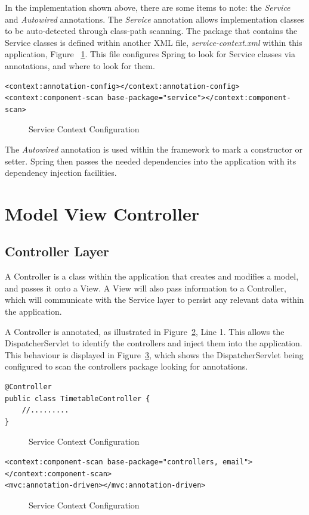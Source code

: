 In the implementation shown above, there are some items to note: the \textit{Service} and \textit{Autowired} annotations. The \textit{Service} annotation allows implementation classes to be auto-detected through class-path scanning. The package that contains the Service classes is defined within another XML file, \textit{service-context.xml} within this application, Figure ~\ref{fig:serviceContext}. This file configures Spring to look for Service classes via annotations, and where to look for them.

\begin{lstlisting}
<context:annotation-config></context:annotation-config>
<context:component-scan base-package="service"></context:component-scan>
\end{lstlisting}
\begin{figure}[H]
\caption{Service Context Configuration}
\label{fig:serviceContext}
\end{figure}

The \textit{Autowired} annotation is used within the framework to mark a constructor or setter. Spring then passes the needed dependencies into the application with its dependency injection facilities. 

\section{Model View Controller}
\subsection{Controller Layer}

A Controller is a class within the application that creates and modifies a model, and passes it onto a View. A View will also pass information to a Controller, which will communicate with the Service layer to persist any relevant data within the application.

A Controller is annotated, as illustrated in Figure~\ref{fig:controller}, Line 1. This allows the DispatcherServlet to identify the controllers and inject them into the application. This behaviour is displayed in Figure~\ref{fig:dscomponent}, which shows the DispatcherServlet being configured to scan the controllers package looking for annotations.

\begin{lstlisting}
@Controller
public class TimetableController {
	//.........
}
\end{lstlisting}
\begin{figure}[H]
\caption{Service Context Configuration}
\label{fig:controller}
\end{figure}
\newpage
\begin{lstlisting}
<context:component-scan base-package="controllers, email"></context:component-scan>
<mvc:annotation-driven></mvc:annotation-driven>
\end{lstlisting}
\begin{figure}[H]
\caption{Service Context Configuration}
\label{fig:dscomponent}
\end{figure}

